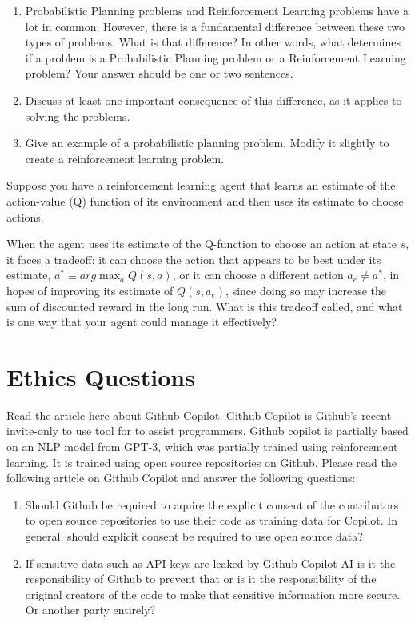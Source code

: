 \documentclass{article}
\begin{document}
\item
  
\begin{enumerate}
\item Probabilistic Planning problems and Reinforcement Learning
  problems have a lot in common; However, there is a fundamental
  difference between these two types of problems. What is that
  difference? In other words, what determines if a problem is a
  Probabilistic Planning problem or a Reinforcement Learning problem?
  Your answer should be one or two sentences.

\item Discuss at least one important consequence of this difference,
  as it applies to solving the problems.

\item Give an example of a probabilistic planning problem. Modify it
  slightly to create a reinforcement learning problem.  
\end{enumerate}

\item Suppose you have a reinforcement learning agent that learns an
  estimate of the action-value (Q) function of its environment and
  then uses its estimate to choose actions.

  When the agent uses its estimate of the Q-function to choose an
  action at state $s$, it faces a tradeoff: it can choose the action
  that appears to be best under its estimate, $a^* \equiv arg\max_a
  {Q(s, a)}$, or it can choose a different action $a_e \neq a^*$, in
  hopes of improving its estimate of $Q(s, a_e)$, since doing so may
  increase the sum of discounted reward in the long run. What is
  this tradeoff called, and what is one way that your agent could
  manage it effectively?
\fi
    

\section{Ethics Questions}
Read the article \href{https://www.fast.ai/2021/07/19/copilot/}{here} about Github Copilot. Github Copilot is Github's recent invite-only to use tool for to assist programmers. Github copilot is partially based on an NLP model from GPT-3, which was partially trained using reinforcement learning. It is trained using open source repositories on Github. Please read the following article on Github Copilot and answer the following questions:
\begin{enumerate}
    \item Should Github be required to aquire the explicit consent of the contributors to open source repositories to use their code as training data for Copilot. In general. should explicit consent be required to use open source data?
    \item If sensitive data such as API keys are leaked by Github Copilot AI is it the responsibility of Github to prevent that or is it the responsibility of the original creators of the code to make that sensitive information more secure. Or another party entirely?
\end{enumerate}
\end{document}
